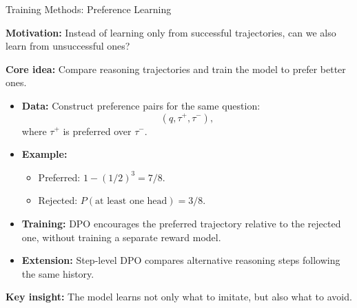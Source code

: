 \documentclass[aspectratio=169]{beamer}
\begin{document}
\begin{frame}{Training Methods: Preference Learning}

\textbf{Motivation:} Instead of learning only from successful trajectories, can we also learn from unsuccessful ones?

\vspace{0.3cm}

\textbf{Core idea:} Compare reasoning trajectories and train the model to prefer better ones.

\begin{itemize}
    \item \textbf{Data:} Construct preference pairs for the same question:
    \[
    (q,\tau^+,\tau^-),
    \]
    where $\tau^+$ is preferred over $\tau^-$.

    \item \textbf{Example:}
    \begin{itemize}
        \item Preferred: $1-(1/2)^3=7/8$.
        \item Rejected: $P(\text{at least one head})=3/8$.
    \end{itemize}

    \item \textbf{Training:} DPO encourages the preferred trajectory relative to the rejected one, without training a separate reward model.

    \item \textbf{Extension:} Step-level DPO compares alternative reasoning steps following the same history.
\end{itemize}

\vspace{0.2cm}

\textbf{Key insight:} The model learns not only what to imitate, but also what to avoid.

\end{frame}
\end{document}
